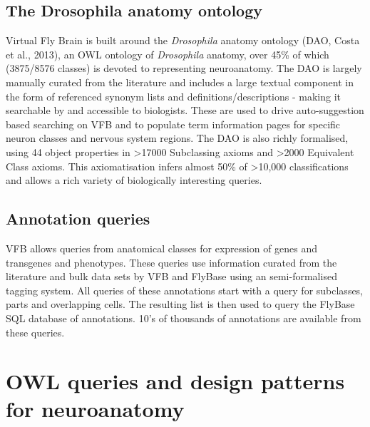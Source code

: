 \documentclass[runningheads,a4paper]{llncs}
\begin{document}
\subsection{The Drosophila anatomy ontology}

Virtual Fly Brain is built around the \textit{Drosophila} anatomy
ontology (DAO, Costa et al., 2013), an OWL ontology of
\textit{Drosophila} anatomy, over 45\% of which (3875/8576 classes) is
devoted to representing neuroanatomy. The DAO is largely manually
curated from the literature and includes a large textual component in
the form of referenced synonym lists and definitions/descriptions -
making it searchable by and accessible to biologists.  These are used
to drive auto-suggestion based searching on VFB and to populate term
information pages for specific neuron classes and nervous system
regions. The DAO is also richly formalised, using 44 object properties
in \textgreater 17000 Subclassing axioms and \textgreater 2000
Equivalent Class axioms.  This axiomatisation infers almost 50\% of
\textgreater 10,000 classifications and allows a rich variety of
biologically interesting queries.

\subsection*{Annotation queries}

VFB allows queries from anatomical classes for expression of
genes and transgenes and phenotypes.  These queries use information
curated from the literature and bulk data sets by VFB and FlyBase using an
semi-formalised tagging system. All queries of these annotations start
with a query for subclasses, parts and overlapping cells.  The
resulting list is then used to query the FlyBase SQL database of
annotations.  10's of thousands of annotations are available from
these queries.



  

\section{OWL queries and design patterns for neuroanatomy} 
\end{document}
